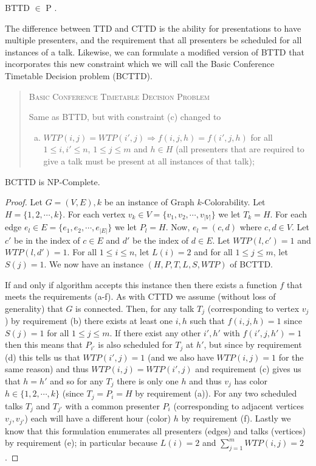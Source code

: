 \documentclass{svjour3}                     %
\begin{document}
\begin{remark}
	BTTD $\in$ P \cite{lovelace2010}.
\end{remark}
The difference between TTD and CTTD is the ability for presentations to have multiple presenters, and the requirement that all presenters be scheduled for all instances of a talk. Likewise, we can formulate a modified version of BTTD that incorporates this new constraint which we will call the Basic Conference Timetable Decision problem (BCTTD). 
\begin{quote}
	\textsc{Basic Conference Timetable Decision Problem}
	
	Same as BTTD, but with constraint (c) changed to
	\begin{enumerate}[(c)]
		\item $WTP(i,j) = WTP(i',j) \Rightarrow f(i,j,h)=f(i',j,h)$ for all $1 \le i,i' \le n$, $1 \le j \le m$ and $h \in H$ (all presenters that are required to give a talk must be present at all instances of that talk);
	\end{enumerate}
\end{quote}
\begin{theorem}
	BCTTD is NP-Complete.
\end{theorem}
\begin{proof}\label{bcttd_np}
	Let $G=(V,E),k$ be an instance of Graph $k$-Colorability. Let $H=\{1, 2, \cdots, k\}$. For each vertex $v_k \in V=\{v_1, v_2, \cdots, v_{|V|}\}$ we let $T_k = H$. For each edge $e_l \in E=\{e_1, e_2, \cdots, e_{|E|}\}$ we let $P_l = H$. Now, $e_l = (c,d)$ where $c,d \in V$. Let $c'$ be in the index of $c \in E$ and $d'$ be the index of $d \in E$. Let $WTP(l,c')=1$ and $WTP(l,d')=1$. For all $1 \le i \le n$, let $L(i)=2$ and for all $1 \le j \le m$, let $S(j)=1$. We now have an instance $(H,P,T,L,S,WTP)$ of BCTTD.
	
	If and only if algorithm accepts this instance then there exists a function $f$ that meets the requirements (a-f). As with CTTD we assume (without loss of generality) that $G$ is connected. Then, for any talk $T_j$ (corresponding to vertex $v_j$) by requirement (b) there exists at least one $i, h$ such that $f(i,j,h) = 1$ since $S(j)=1$ for all $1 \le j \le m$. If there exist any other $i',h'$ with $f(i',j,h')=1$ then this means that $P_{i'}$ is also scheduled for $T_j$ at $h'$, but since by requirement (d) this tells us that $WTP(i',j)=1$ (and we also have $WTP(i,j)=1$ for the same reason) and thus $WTP(i,j)=WTP(i',j)$ and requirement (c) gives us that $h=h'$ and so for any $T_j$ there is only one $h$ and thus $v_j$ has color $h \in \{1,2,\cdots,k\}$ (since $T_j=P_i=H$ by requirement (a)). For any two scheduled talks $T_j$ and $T_{j'}$ with a common presenter $P_i$ (corresponding to adjacent vertices $v_j, v_{j'}$) each will have a different hour (color) $h$ by requirement (f). Lastly we know that this formulation enumerates all presenters (edges) and talks (vertices) by requirement (e); in particular because $L(i) = 2$ and $\sum_{j=1}^{m} WTP(i,j) = 2$.
\end{proof}
\end{document}
